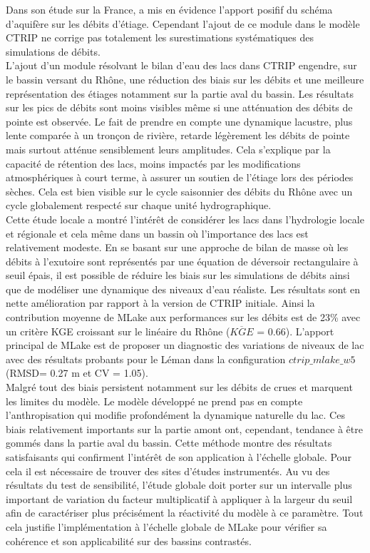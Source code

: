 Dans son étude sur la France, \citet{vergnes2012} a mis en évidence l'apport posifif du schéma d'aquifère sur les débits d'étiage. Cependant l'ajout de ce module dans le modèle CTRIP ne corrige pas totalement les surestimations systématiques des simulations de débits.\\ 
L'ajout d'un module résolvant le bilan d'eau des lacs dans CTRIP engendre, sur le bassin versant du Rhône, une réduction des biais sur les débits et une meilleure représentation des étiages notamment sur la partie aval du bassin. Les résultats sur les pics de débits sont moins visibles même si une atténuation des débits de pointe est observée. Le fait de prendre en compte une dynamique lacustre, plus lente comparée à un tronçon de rivière, retarde légèrement les débits de pointe mais surtout atténue sensiblement leurs amplitudes. Cela s'explique par la capacité de rétention des lacs, moins impactés par les modifications atmosphériques à court terme, à assurer un soutien de l'étiage lors des périodes sèches. Cela est bien visible sur le cycle saisonnier des débits du Rhône avec un cycle globalement respecté sur chaque unité hydrographique. \\

Cette étude locale a montré l'intérêt de considérer les lacs dans l'hydrologie locale et régionale et cela même dans un bassin où l'importance des lacs est relativement modeste.
En se basant sur une approche de bilan de masse où les débits à l'exutoire sont représentés par une équation de déversoir rectangulaire à seuil épais, il est possible de réduire les biais sur les simulations de débits ainsi que de modéliser une dynamique des niveaux d'eau réaliste. Les résultats sont en nette amélioration par rapport à la version de CTRIP initiale. Ainsi la contribution moyenne de MLake aux performances sur les débits est de 23\% avec un critère KGE croissant sur le linéaire du Rhône ($\overline{KGE}$ = 0.66). L'apport principal de MLake est de proposer un diagnostic des variations de niveaux de lac avec des résultats probants pour le Léman dans la configuration $ctrip\_mlake\_w5$ (RMSD= 0.27 m et CV = 1.05).\\

Malgré tout des biais persistent notamment sur les débits de crues et marquent les limites du modèle. Le modèle développé ne prend pas en compte l'anthropisation qui modifie profondément la dynamique naturelle du lac. Ces biais relativement importants sur la partie amont ont, cependant, tendance à être gommés dans la partie aval du bassin.
Cette méthode montre des résultats satisfaisants qui confirment l'intérêt de son application à l'échelle globale. Pour cela il est nécessaire de trouver des sites d'études instrumentés. Au vu des résultats du test de sensibilité, l'étude globale doit porter sur un intervalle plus important de variation du facteur multiplicatif à appliquer à la largeur du seuil afin de caractériser plus précisément la réactivité du modèle à ce paramètre. Tout cela justifie l'implémentation à l'échelle globale de MLake pour vérifier sa cohérence et son applicabilité sur des bassins contrastés.
